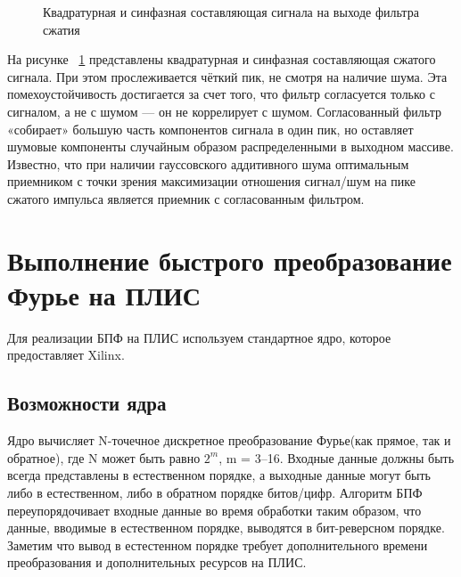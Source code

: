 \begin{figure}[h]
    \centering
    \noindent
    \caption{Квадратурная и синфазная составляющая сигнала на выходе фильтра сжатия}
    \label{fig:correl}
\end{figure}

На рисунке ~\ref{fig:correl} представлены квадратурная и синфазная составляющая сжатого сигнала. При этом прослеживается чёткий пик, не смотря на наличие шума. Эта помехоустойчивость достигается за счет того, что фильтр согласуется только с сигналом, а не с шумом — он не коррелирует с шумом. Согласованный фильтр «собирает» большую часть компонентов сигнала в один пик, но оставляет шумовые компоненты случайным образом распределенными в выходном массиве. Известно, что при наличии гауссовского аддитивного шума оптимальным приемником с точки зрения максимизации отношения сигнал/шум на пике сжатого импульса является приемник с согласованным фильтром.

\section{Выполнение быстрого преобразование Фурье на ПЛИС}

Для реализации БПФ на ПЛИС используем стандартное ядро, которое предоставляет Xilinx.

\subsection{Возможности ядра}

Ядро вычисляет N-точечное дискретное преобразование Фурье(как прямое, так и обратное), где N может быть равно $2^m$, m = 3–16. Входные данные должны быть всегда представлены в естественном порядке, а выходные данные могут быть либо в естественном, либо в обратном порядке битов/цифр. Алгоритм БПФ переупорядочивает входные данные во время обработки таким образом, что данные, вводимые в естественном порядке, выводятся в бит-реверсном порядке. Заметим что вывод в естестенном порядке требует дополнительного времени преобразования и дополнительных ресурсов на ПЛИС.  

